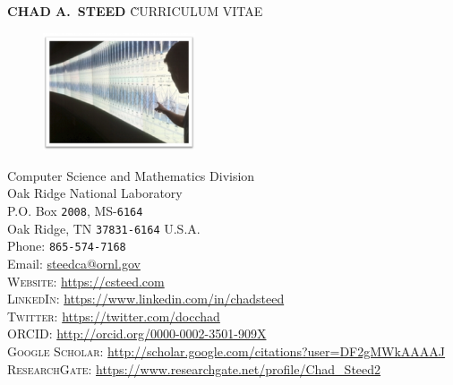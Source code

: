 \documentclass[11pt, letterpaper]{article}
\begin{document}
\thispagestyle{firststyle}

\begin{tabbing}
    {\sffamily \LARGE \textbf{CHAD A.\ STEED}} \` {\sffamily \LARGE CURRICULUM VITAE}
\end{tabbing}

\begin{figure}
  \vspace{-30pt}
  \begin{center}
    \includegraphics[width=0.4\textwidth]{climate-framed.png}
  \end{center}
  \vspace{-20pt}
\end{figure}

Computer Science and Mathematics Division\\
Oak Ridge National Laboratory\\
P.O. Box \texttt{2008}, MS-\texttt{6164}\\
Oak Ridge, TN \texttt{37831-6164}
U.S.A.\\[.2cm]
Phone: \texttt{865-574-7168}\\
Email: \href{mailto:steedca@ornl.gov}{steedca@ornl.gov}\\[.2cm]
\textsc{Website}: \href{https://csteed.com}{https://csteed.com}\\
\textsc{LinkedIn}: \href{https://www.linkedin.com/in/chadsteed}{https://www.linkedin.com/in/chadsteed}\\
\textsc{Twitter}: \href{https://twitter.com/docchad}{https://twitter.com/docchad}\\
\textsc{ORCID}:
\href{http://orcid.org/0000-0002-3501-909X}{http://orcid.org/0000-0002-3501-909X}\\
\textsc{Google Scholar}: \href{http://scholar.google.com/citations?user=DF2gMWkAAAAJ}{http://scholar.google.com/citations?user=DF2gMWkAAAAJ}\\
\textsc{ResearchGate}: \href{https://www.researchgate.net/profile/Chad\_Steed2}{https://www.researchgate.net/profile/Chad\_Steed2}
\end{document}
